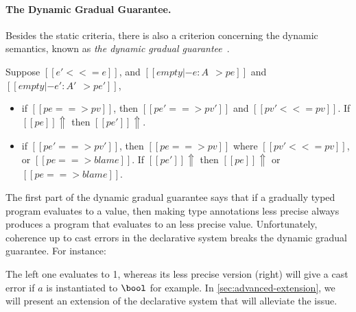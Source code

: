 \paragraph{The Dynamic Gradual Guarantee.}

Besides the static criteria, there is also a criterion concerning the dynamic
semantics, known as \emph{the dynamic gradual guarantee}~\citep{siek2015refined}.

\begin{definition}
  Suppose $[[ e' <<= e ]]$, and $ [[ empty |- e : A ~~> pe]] $ and
  $ [[empty |- e' : A' ~~> pe' ]] $,
  \begin{itemize}
    \item if $[[pe ==> pv]]$, then $[[pe' ==> pv']]$ and $[[pv' <<= pv]]$. If $[[pe]] \Uparrow $ then $[[pe']] \Uparrow$.
    \item if $[[pe' ==> pv']]$, then $[[pe ==> pv]]$ where $[[pv' <<= pv]]$,
      or $[[ pe ==> blame ]]$. If $[[pe']] \Uparrow$ then $[[pe]] \Uparrow$ or $[[pe ==> blame]]$.
  \end{itemize}
\end{definition}

The first part of the dynamic gradual guarantee says that if a gradually typed program
evaluates to a value, then making type annotations less precise always produces
a program that evaluates to an less precise value. Unfortunately, coherence
up to cast errors in the declarative system breaks the dynamic gradual guarantee. For
instance:
The left one evaluates to 1, whereas its less precise version (right) will give
a cast error if $a$ is instantiated to $\bool$ for example.
In \cref{sec:advanced-extension}, we will present an extension of the declarative system
that will alleviate the issue.



